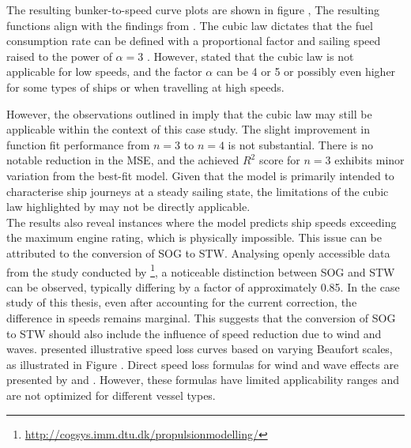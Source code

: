 The resulting bunker-to-speed curve plots are shown in figure , The resulting functions align with the findings from . The cubic law dictates that the fuel consumption rate can be defined with a proportional factor and sailing speed raised to the power of $\alpha = 3$ . However,  stated that the cubic law is not applicable for low speeds, and the factor $\alpha$ can be 4 or 5 or possibly even higher for some types of ships or when travelling at high speeds.\\ 

\pagebreak

However, the observations outlined in  imply that the cubic law may still be applicable within the context of this case study. The slight improvement in function fit performance from $n = 3$ to $n = 4$ is not substantial. There is no notable reduction in the MSE, and the achieved $R^2$ score for $n = 3$ exhibits minor variation from the best-fit model. Given that the model is primarily intended to characterise ship journeys at a steady sailing state, the limitations of the cubic law highlighted by \citet{Psaraftis.2013} may not be directly applicable.\\


The results also reveal instances where the model predicts ship speeds exceeding the maximum engine rating, which is physically impossible. This issue can be attributed to the conversion of SOG to STW. Analysing openly accessible data from the study conducted by \footnote{\url{http://cogsys.imm.dtu.dk/propulsionmodelling/}}, a noticeable distinction between SOG and STW can be observed, typically differing by a factor of approximately 0.85. In the case study of this thesis, even after accounting for the current correction, the difference in speeds remains marginal. This suggests that the conversion of SOG to STW should also include the influence of speed reduction due to wind and waves.  presented illustrative speed loss curves based on varying Beaufort scales, as illustrated in Figure . Direct speed loss formulas for wind and wave effects are presented by  and . However, these formulas have limited applicability ranges and are not optimized for different vessel types.\\

